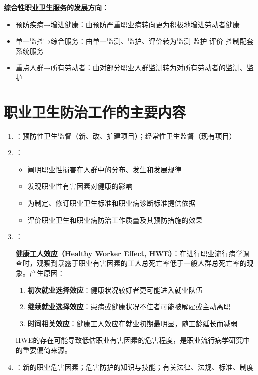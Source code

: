 \begin{tipbox}
\textbf{综合性职业卫生服务的发展方向：}
\begin{itemize}[leftmargin=*]
    \item 预防疾病→增进健康：由预防严重职业病转向更为积极地增进劳动者健康
    \item 单一监控→综合服务：由单一监测、监护、评价转为监测-监护-评价-控制配套系统服务
    \item 重点人群→所有劳动者：由对部分职业人群监测转为对所有劳动者的监测、监护
\end{itemize}
\end{tipbox}

\section{职业卫生防治工作的主要内容}

\begin{enumerate}[leftmargin=*]
    \item {}：预防性卫生监督（新、改、扩建项目）；经常性卫生监督（现有项目）
    \item {}：
    \begin{itemize}
        \item 阐明职业性损害在人群中的分布、发生和发展规律
        \item 发现职业性有害因素对健康的影响
        \item 为制定、修订职业卫生标准和职业病诊断标准提供依据
        \item 评价职业卫生和职业病防治工作质量及其预防措施的效果
    \end{itemize}
    \item {}：
    \begin{defbox}
    \textbf{健康工人效应（Healthy Worker Effect, HWE）}：在进行职业流行病学调查时，观察到暴露于职业有害因素的工人总死亡率低于一般人群总死亡率的现象。产生原因：
    \begin{enumerate}[leftmargin=*]
        \item \textbf{初次就业选择效应}：健康状况较好者更可能进入就业队伍
        \item \textbf{继续就业选择效应}：患病或健康状况不佳者可能被解雇或主动离职
        \item \textbf{时间相关效应}：健康工人效应在就业初期最明显，随工龄延长而减弱
    \end{enumerate}
    HWE的存在可能导致低估职业有害因素的危害程度，是职业流行病学研究中的重要偏倚来源。
    \end{defbox}
    \item {}：新的职业危害因素；危害防护的知识与技能；有关法律、法规、标准、制度
\end{enumerate}

